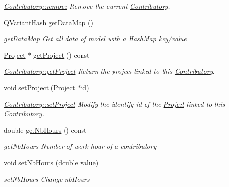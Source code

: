 \begin{DoxyCompactItemize}
\begin{DoxyCompactList}\small\item\em \hyperlink{classModels_1_1Contributory_ab9971d7867516b488095e63e1179eac8}{Contributory\-::remove} Remove the current \hyperlink{classModels_1_1Contributory}{Contributory}. \end{DoxyCompactList}\item 
Q\-Variant\-Hash \hyperlink{classModels_1_1Contributory_a692f563f0428866441ea8bc2b9e772ca}{get\-Data\-Map} ()
\begin{DoxyCompactList}\small\item\em get\-Data\-Map Get all data of model with a Hash\-Map key/value \end{DoxyCompactList}\item 
\hyperlink{classModels_1_1Project}{Project} $\ast$ \hyperlink{classModels_1_1Contributory_a49379aeb4de2376d5a2aaf10f54daf05}{get\-Project} () const 
\begin{DoxyCompactList}\small\item\em \hyperlink{classModels_1_1Contributory_a49379aeb4de2376d5a2aaf10f54daf05}{Contributory\-::get\-Project} Return the project linked to this \hyperlink{classModels_1_1Contributory}{Contributory}. \end{DoxyCompactList}\item 
void \hyperlink{classModels_1_1Contributory_a4478894daf317068856b707491d03555}{set\-Project} (\hyperlink{classModels_1_1Project}{Project} $\ast$id)
\begin{DoxyCompactList}\small\item\em \hyperlink{classModels_1_1Contributory_a4478894daf317068856b707491d03555}{Contributory\-::set\-Project} Modify the identify {\itshape id} of the \hyperlink{classModels_1_1Project}{Project} linked to this \hyperlink{classModels_1_1Contributory}{Contributory}. \end{DoxyCompactList}\item 
double \hyperlink{classModels_1_1Contributory_ae85caa255441140fc1a3a0e91531bfc0}{get\-Nb\-Hours} () const 
\begin{DoxyCompactList}\small\item\em get\-Nb\-Hours Number of work hour of a contributory \end{DoxyCompactList}\item 
void \hyperlink{classModels_1_1Contributory_a1c7d65ee311232d3fd00cf8e4777f1c7}{set\-Nb\-Hours} (double value)
\begin{DoxyCompactList}\small\item\em set\-Nb\-Hours Change nb\-Hours \end{DoxyCompactList}\item 

\end{DoxyCompactItemize}

